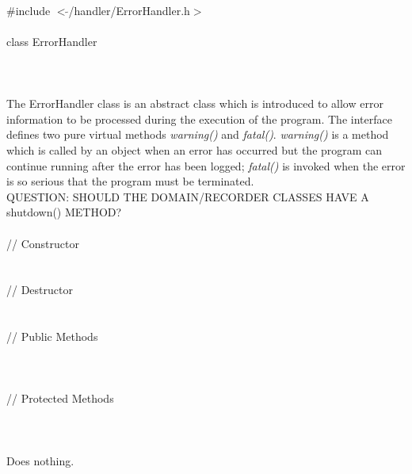 
   \\
\indent \#include $<\tilde{ }$/handler/ErrorHandler.h$>$  \\

  \\
\indent class ErrorHandler \\

 \\
 \\

  \\
\indent The ErrorHandler class is an abstract class which is
introduced to allow error information to be processed during the
execution of the program. The interface defines two pure virtual
methods {\em warning()} and {\em fatal()}. {\em warning()} is a method
which is called by an object when an error has occurred but the program
can continue running after the error has been logged; {\em fatal()} is
invoked when the error is so serious that the program must be
terminated. \\ 

QUESTION: SHOULD THE DOMAIN/RECORDER CLASSES HAVE A shutdown() METHOD? \\

 \\
\indent // Constructor \\
\\ \\
\indent // Destructor \\
\\ \\
\indent // Public Methods  \\
\\
\\ \\
\indent // Protected Methods  \\
 \\

  \\
  \\ 
Does nothing.\\

